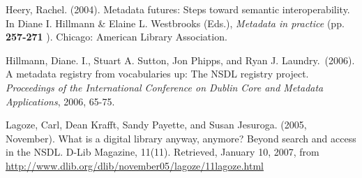 \documentclass[11pt,a4paper]{article}
\begin{document}
\hangindent=0.7cm Heery, Rachel.  (2004). Metadata futures: Steps toward semantic interoperability. In Diane I. Hillmann \& Elaine L. Westbrooks (Eds.), {\it Metadata in practice}  (pp. {\bf 257-271
}).  Chicago: American Library Association.

\hangindent=0.7cm Hillmann, Diane. I., Stuart A. Sutton, Jon Phipps, and Ryan J. Laundry.\ (2006). A metadata registry from vocabularies up: The NSDL registry project.  {\it Proceedings of the International Conference on Dublin Core and Metadata Applications}, 2006, 65-75.

\hangindent=0.7cm Lagoze, Carl, Dean Krafft, Sandy Payette, and Susan Jesuroga. (2005, November). What is a digital library anyway, anymore? Beyond search and access in the NSDL.  D-Lib Magazine, 11(11).  Retrieved, January 10, 2007, from \url{http://www.dlib.org/dlib/november05/lagoze/11lagoze.html}
\end{document}
